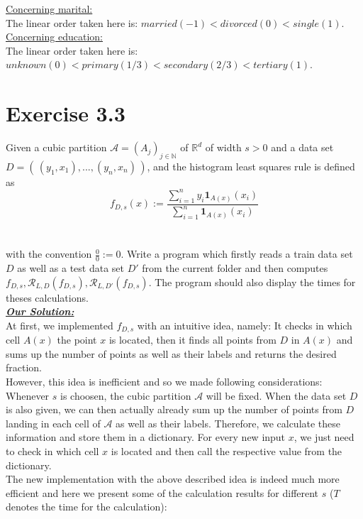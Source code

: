 \documentclass{article}
\begin{document}
\underline{Concerning marital: }\\
The linear order taken here is: $married (-1) < divorced(0)<single(1)$.\\
\underline{Concerning education: }\\
The linear order taken here is: $unknown(0)<primary(1/3)<secondary(2/3)<tertiary(1)$.\\





















\section*{Exercise 3.3} \vspace*{-1em}
Given a cubic partition $\mathcal{A}=(A_j)_{j\in \mathbb{N}}$ of $\mathbb{R}^d$ of width $s>0$ and a data set $D=(\, (y_1,x_1),..., (y_n, x_n)   \,)$, and the histogram least squares rule is defined as \vspace*{-0.5em}
\begin{equation}
f_{D,s}(x):=  \frac{\sum_{i=1}^n y_i \mathbf{1}_{A(x)} (x_i) }{\sum_{i=1}^n  \mathbf{1}_{A(x)} (x_i)  }
\end{equation} \\
\vspace*{-4em}\\
with the convention $\frac{0}{0}:=0$. Write a program which firstly reads a train data set $D$ as well as a test data set $D'$ from the current folder and then computes $f_{D,s},  \mathcal{R}_{L,D}(f_{D,s}), \mathcal{R}_{L,D'}(f_{D,s}) $. The program should also display the times for theses calculations.\\
\textbf{\underline{\textit{Our Solution:}}}\\
At first, we implemented $f_{D,s}$ with an intuitive idea, namely: It checks in which cell $A(x)$ the point $x$ is located, then it finds all points from $D$ in $A(x)$ and sums up the number of points as well as their labels and returns the desired fraction. \\
However, this idea is inefficient and so we made following considerations:\\
Whenever $s$ is choosen, the cubic partition $\mathcal{A}$ will be fixed. When the data set $D$ is also given, we can then actually already sum up the number of points from $D$ landing in each cell of $\mathcal{A}$ as well as their labels. Therefore, we calculate these information and store them in a dictionary. For every new input $x$, we just need to check in which cell $x$ is located and then call the respective value from the dictionary. \\
The new implementation with the above described idea is indeed much more efficient and here we present some of the calculation results for different $s$ ($T$ denotes the time for the calculation): \\
\end{document}
